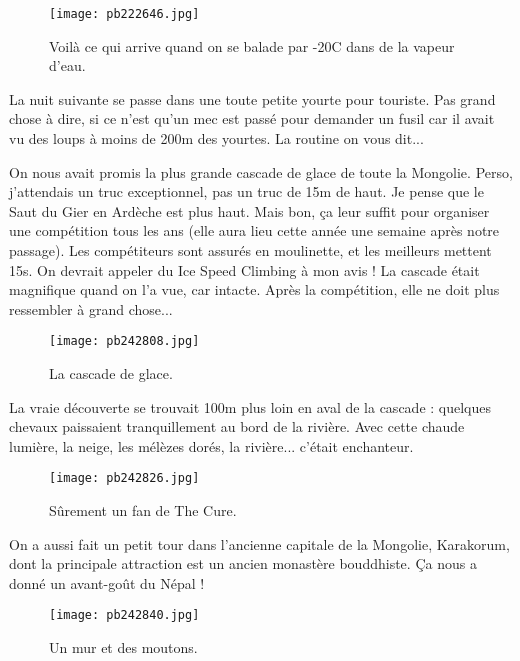 \documentclass{book}
\begin{document}
\begin{figure}[h]
\centering
\texttt{[image: pb222646.jpg]}
\caption*{ Voilà ce qui arrive quand on se balade par -20\textdegree C dans de la vapeur d'eau.}
\end{figure}

La nuit suivante se passe dans une toute petite yourte pour touriste. Pas grand chose à dire, si ce n'est qu'un mec est passé pour demander un fusil car il avait vu des loups à moins de 200m des yourtes. La routine on vous dit...

On nous avait promis la plus grande cascade de glace de toute la Mongolie. Perso, j'attendais un truc exceptionnel, pas un truc de 15m de haut. Je pense que le Saut du Gier en Ardèche est plus haut. Mais bon, ça leur suffit pour organiser une compétition tous les ans (elle aura lieu cette année une semaine après notre passage). Les compétiteurs sont assurés en moulinette, et les meilleurs mettent 15s. On devrait appeler du Ice Speed Climbing à mon avis ! La cascade était magnifique quand on l'a vue, car intacte. Après la compétition, elle ne doit plus ressembler à grand chose...


\begin{figure}[h]
\centering
\texttt{[image: pb242808.jpg]}
\caption*{ La cascade de glace.}
\end{figure}

La vraie découverte se trouvait 100m plus loin en aval de la cascade : quelques chevaux paissaient tranquillement au bord de la rivière. Avec cette chaude lumière, la neige, les mélèzes dorés, la rivière... c'était enchanteur.


\begin{figure}[h]
\centering
\texttt{[image: pb242826.jpg]}
\caption*{ Sûrement un fan de The Cure.}
\end{figure}

On a aussi fait un petit tour dans l'ancienne capitale de la Mongolie, Karakorum, dont la principale attraction est un ancien monastère bouddhiste. Ça nous a donné un avant-goût du Népal !


\begin{figure}[h]
\centering
\texttt{[image: pb242840.jpg]}
\caption*{ Un mur et des moutons.}
\end{figure}
\end{document}
